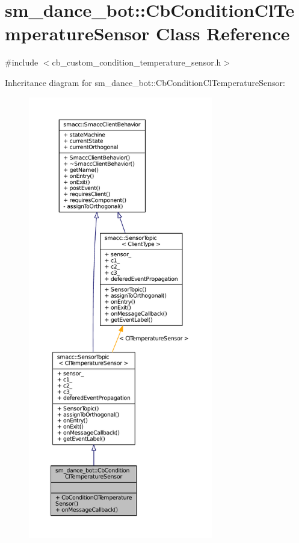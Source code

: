 \hypertarget{classsm__dance__bot_1_1CbConditionClTemperatureSensor}{}\section{sm\+\_\+dance\+\_\+bot\+:\+:Cb\+Condition\+Cl\+Temperature\+Sensor Class Reference}
\label{classsm__dance__bot_1_1CbConditionClTemperatureSensor}


{\ttfamily \#include $<$cb\+\_\+custom\+\_\+condition\+\_\+temperature\+\_\+sensor.\+h$>$}



Inheritance diagram for sm\+\_\+dance\+\_\+bot\+:\+:Cb\+Condition\+Cl\+Temperature\+Sensor\+:
\nopagebreak
\begin{figure}[H]
\begin{center}
\leavevmode
\includegraphics[height=550pt]{classsm__dance__bot_1_1CbConditionClTemperatureSensor__inherit__graph}
\end{center}
\end{figure}


